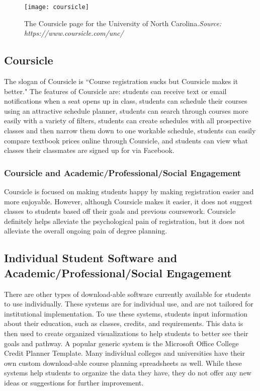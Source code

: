 \begin{figure}[h]
\centering
\texttt{[image: coursicle]}
\caption{The Coursicle page for the University of North Carolina.\textit{Source: https://www.coursicle.com/unc/}}
\end{figure}
\subsection{Coursicle}
The slogan of Coursicle is ``Course registration sucks but Coursicle makes it better." The features of Coursicle are: students can receive text or email notifications when a seat opens up in class, students can schedule their courses using an attractive schedule planner, students can search through courses more easily with a variety of filters, students can create schedules with all prospective classes and then narrow them down to one workable schedule, students can easily compare textbook prices online through Coursicle, and students can view what classes their classmates are signed up for via Facebook. 

\subsubsection{Coursicle and Academic/Professional/Social Engagement}
Coursicle is focused on making students happy by making registration easier and more enjoyable. However, although Coursicle makes it easier, it does not suggest classes to students based off their goals and previous coursework. Coursicle definitely helps alleviate the psychological pain of registration, but it does not alleviate the overall ongoing pain of degree planning. 

\subsection{Individual Student Software and Academic/Professional/Social Engagement}
There are other types of download-able software currently available for students to use individually. These systems are for individual use, and are not tailored for institutional implementation. To use these systems, students input information about their education, such as classes, credits, and requirements. This data is then used to create organized visualizations to help students to better see their goals and pathway. A popular generic system is the Microsoft Office College Credit Planner Template. Many individual colleges and universities have their own custom download-able course planning spreadsheets as well. While these systems help students to organize the data they have, they do not offer any new ideas or suggestions for further improvement.


